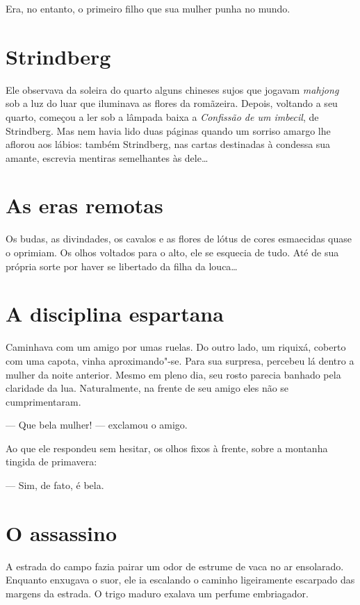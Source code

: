 Era, no entanto, o primeiro filho que sua mulher punha no mundo.

\section{Strindberg}

Ele observava da soleira do quarto alguns chineses sujos que jogavam
\textit{mahjong} sob a luz do luar que iluminava as flores da
romãzeira. Depois, voltando a seu quarto, começou a ler sob a lâmpada
baixa a \textit{Confissão de um imbecil}, de Strindberg. Mas nem havia
lido duas páginas quando um sorriso amargo lhe aflorou aos lábios:
também Strindberg, nas cartas destinadas à condessa sua amante,
escrevia mentiras semelhantes às dele\ldots{}

\section{As eras remotas}

Os budas, as divindades, os cavalos e as flores de lótus de cores
esmaecidas quase o oprimiam. Os olhos voltados para o alto, ele se
esquecia de tudo. Até de sua própria sorte por haver se libertado da
filha da louca\ldots{}

\section{A disciplina espartana}

Caminhava com um amigo por umas ruelas. Do outro lado, um riquixá,
coberto com uma capota, vinha aproximando"-se. Para sua surpresa,
percebeu lá dentro a mulher da noite anterior. Mesmo em pleno dia, seu
rosto parecia banhado pela claridade da lua.  Naturalmente, na frente
de seu amigo eles não se cumprimentaram.

--- Que bela mulher! --- exclamou o amigo.

Ao que ele respondeu sem hesitar, os olhos fixos à frente, sobre a
montanha tingida de primavera:

--- Sim, de fato, é bela.

\section{O assassino}

A estrada do campo fazia pairar um odor de estrume de vaca no ar
ensolarado. Enquanto enxugava o suor, ele ia escalando o caminho
ligeiramente escarpado das margens da estrada. O trigo maduro exalava
um perfume embriagador.

